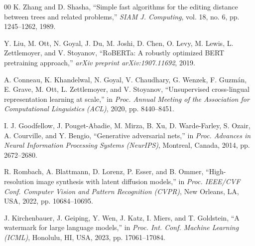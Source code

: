 \documentclass[10pt,twocolumn]{article}
\begin{document}
\begin{thebibliography}{00}
K. Zhang and D. Shasha, ``Simple fast algorithms for the editing distance between trees and related problems,'' \textit{SIAM J. Computing}, vol. 18, no. 6, pp. 1245--1262, 1989.

Y. Liu, M. Ott, N. Goyal, J. Du, M. Joshi, D. Chen, O. Levy, M. Lewis, L. Zettlemoyer, and V. Stoyanov, ``RoBERTa: A robustly optimized BERT pretraining approach,'' \textit{arXiv preprint arXiv:1907.11692}, 2019.

A. Conneau, K. Khandelwal, N. Goyal, V. Chaudhary, G. Wenzek, F. Guzm\'{a}n, E. Grave, M. Ott, L. Zettlemoyer, and V. Stoyanov, ``Unsupervised cross-lingual representation learning at scale,'' in \textit{Proc. Annual Meeting of the Association for Computational Linguistics (ACL)}, 2020, pp. 8440--8451.

I. J. Goodfellow, J. Pouget-Abadie, M. Mirza, B. Xu, D. Warde-Farley, S. Ozair, A. Courville, and Y. Bengio, ``Generative adversarial nets,'' in \textit{Proc. Advances in Neural Information Processing Systems (NeurIPS)}, Montreal, Canada, 2014, pp. 2672--2680.

R. Rombach, A. Blattmann, D. Lorenz, P. Esser, and B. Ommer, ``High-resolution image synthesis with latent diffusion models,'' in \textit{Proc. IEEE/CVF Conf. Computer Vision and Pattern Recognition (CVPR)}, New Orleans, LA, USA, 2022, pp. 10684--10695.

J. Kirchenbauer, J. Geiping, Y. Wen, J. Katz, I. Miers, and T. Goldstein, ``A watermark for large language models,'' in \textit{Proc. Int. Conf. Machine Learning (ICML)}, Honolulu, HI, USA, 2023, pp. 17061--17084.

\end{thebibliography}
\end{document}
